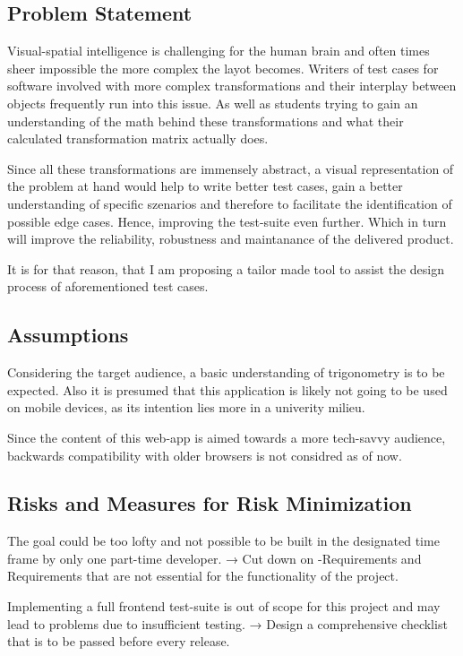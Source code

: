 \subsection{Problem Statement}
Visual-spatial intelligence is challenging for the human brain and often times sheer impossible the more complex the layot becomes. Writers of test cases for software involved with more complex transformations and their interplay between objects frequently run into this issue. As well as students trying to gain an understanding of the math behind these transformations and what their calculated transformation matrix actually does.

Since all these transformations are immensely abstract, a visual representation of the problem at hand would help to write better test cases, gain a better understanding of specific szenarios and therefore to facilitate the identification of possible edge cases. Hence, improving the test-suite even further. Which in turn will improve the reliability, robustness and maintanance of the delivered product.

It is for that reason, that I am proposing a tailor made tool to assist the design process of aforementioned test cases.

\subsection{Assumptions}
Considering the target audience, a basic understanding of trigonometry is to be expected. Also it is  presumed that this application is likely not going to be used on mobile devices, as its intention lies more in a univerity milieu.

Since the content of this web-app is aimed towards a more tech-savvy audience, backwards compatibility with older browsers is not considred as of now.

\subsection{Risks and Measures for Risk Minimization}
The goal could be too lofty and not possible to be built in the designated time frame by only one part-time developer. → Cut down on 
-Requirements and Requirements that are not essential for the functionality of the project.

Implementing a full frontend test-suite is out of scope for this project and may lead to problems due to insufficient testing. → Design a comprehensive checklist that is to be passed before every release.

